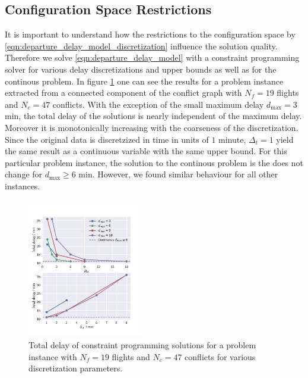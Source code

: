\documentclass[aps,pra,twocolumn,10pt]{revtex4-1}
\begin{document}
\subsection{Configuration Space Restrictions}
It is important to understand how the restrictions to the configuration space by \eqref{eqn:departure_delay_model_discretization} influence the solution quality.
Therefore we solve \eqref{eqn:departure_delay_model} with a constraint programming solver \cite{numberjack} for various delay discretizations and upper bounds as well as for the continous problem.
In figure \ref{fig:delay_only_cp_results} one can see the results for a problem instance extracted from a connected component of the conflict graph with $N_f=19$ flights and $N_c=47$ conflicts.
With the exception of the small maximum delay $d_\text{max} = 3$ min, the total delay of the solutions is nearly independent of the maximum delay.
Moreover it is monotonically increasing with the coarseness of the discretization.
Since the original data is discretzized in time in units of $1$ minute, $\Delta_t=1$ yield the same result as a continuous variable with the same upper bound.
For this particular problem instance, the solution to the continous problem is the does not change for $d_\text{max}\geq6$ min.
However, we found similar behaviour for all other instances.
\begin{figure}[htpb]
    \centering
    \includegraphics[width=0.45\textwidth,natwidth=1,natheight=0]{./pics/delay_only_cp_results.pdf}
    \caption{Total delay of constraint programming solutions for a problem instance with $N_f=19$ flights and $N_c=47$ conflicts for various discretization parameters.}
    \label{fig:delay_only_cp_results}
\end{figure}
\end{document}
